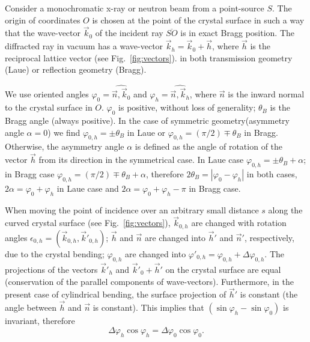 \documentclass[preprint]{iucr}              %
\newcommand{\inred}[1]{{\color{red}#1}}
\begin{document}
Consider a monochromatic x-ray or neutron beam \inred{from} a point-source $S$. The origin of coordinates $O$ is chosen at the point of the crystal surface in such a way that the wave-vector  ${\vec k_0}$ of the incident ray $\overline{SO}$ is in exact Bragg  position. The diffracted ray \inred{in vacuum} has a wave-vector 
$\vec k_h = \vec k_0 + \vec h$, where $\vec h$ is the reciprocal lattice vector (see Fig.~\ref{fig:vectors}).
\inred{in} both transmission geometry (Laue) or reflection geometry (Bragg).

We use oriented angles $\varphi_0 = \widehat{\vec n, \vec k_0}$ and $\varphi_h = \widehat{\vec n, \vec k_h}$, where $\vec n$ is the inward normal to the crystal surface \inred{in $O$}. $\varphi_0$ is positive, without loss of generality; $\theta_B$ is the Bragg angle \inred{(always positive)}.
\inred{In the}  case of symmetric geometry(asymmetry angle $\alpha=0$) \inred{we find} $\varphi_{0,h}=\pm\theta_B$ in Laue or $\varphi_{0,h}=(\pi/2)\mp\theta_B$ in Bragg. Otherwise, the asymmetry angle $\alpha$ is defined as the angle of rotation \inred{of the vector $\vec h$ from its direction in the symmetrical case}. 
In Laue case $\varphi_{0,h}=\pm\theta_B+\alpha$; in Bragg case $\varphi_{0,h}=(\pi/2)\mp\theta_B+\alpha$, therefore $2\theta_B=|\varphi_0-\varphi_h|$ in both cases, $2\alpha=\varphi_0+\varphi_h$ in Laue case and $2\alpha=\varphi_0+\varphi_h-\pi$ in Bragg case.


When moving the point of incidence over an arbitrary small distance $s$ along the curved crystal surface (see Fig.~\ref{fig:vectors}), 
$\vec k_{0,h}$ are changed
with rotation angles $\epsilon_{0,h} = (\vec k_{0,h},\vec k'_{0,h})$; $\vec h$ and $\vec n$ are changed into $\vec h'$ and $\vec n'$, respectively, due to the crystal bending;
$\varphi_{0,h}$ are changed into $\varphi'_{0,h}=\varphi_{0,h}+\Delta \varphi_{0,h}$.
The projections of the vectors $\vec k'_{h}$ and $\vec k'_{0}+\vec h'$ on the crystal surface are equal \inred{(}conservation of the parallel components of wave-vectors\inred{)}.
Furthermore, in the present case of cylindrical bending, the surface projection of $\vec h'$ is constant (the angle between $\vec h$ and $\vec n$ is constant).
This implies that $(\sin \varphi_h - \sin \varphi_0)$ is invariant, therefore
\begin{equation}
\label{eq:invariant}
    \Delta \varphi_h \cos\varphi_h = \Delta \varphi_0 \cos\varphi_0.
\end{equation}
\end{document}
